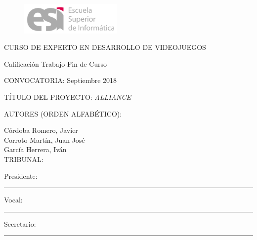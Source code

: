 
\begin{figure}[htb]
\includegraphics[width=5cm]{./images/LogoESILetras.jpg}
\end{figure}

\begin{center}
CURSO DE EXPERTO EN DESARROLLO DE VIDEOJUEGOS 
\vspace*{0.1in}

\begin{LARGE}Calificación Trabajo Fin de Curso\end{LARGE}
\end{center}

\vspace*{0.2in}

CONVOCATORIA: \hspace*{2.5in} Septiembre 2018 
\vspace*{0.1in}

TÍTULO DEL PROYECTO: \hspace*{1.9in} \textit{ALLIANCE}
\vspace*{0.1in}

AUTORES (ORDEN ALFABÉTICO):
\vspace*{0.1in}

\hspace*{0.5in}Córdoba Romero, Javier \\
\hspace*{0.5in}Corroto Martín, Juan José\\
\hspace*{0.5in}García Herrera, Iván\\

\vspace*{0.2in}
TRIBUNAL:
\vspace*{0.1in}

\hspace*{0.5in}Presidente: \hspace*{0.15in} \rule{100mm}{0.1mm}
\vspace*{0.1in}

\hspace*{0.5in}Vocal: \hspace*{0.47in} \rule{100mm}{0.1mm}
\vspace*{0.1in}


\hspace*{0.5in}Secretario: \hspace*{0.18in} \rule{100mm}{0.1mm}
\vspace*{0.1in}

